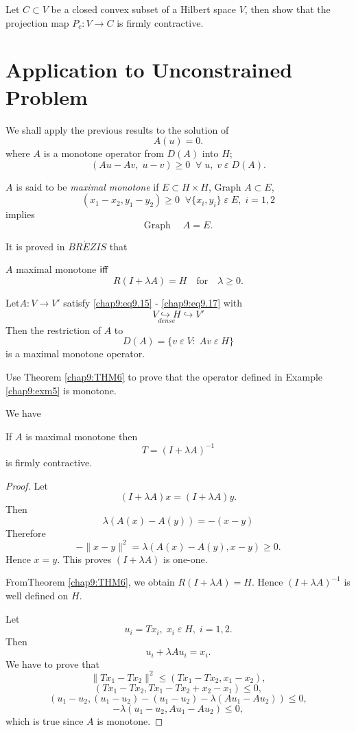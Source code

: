 \begin{exercise}\label{chap9:exr4}
Let $C\subset V$ be a closed convex subset of a Hilbert space $V$,
then show that the projection map $P_c:V\to C$ is firmly contractive.
\end{exercise}

\section{Application to Unconstrained Problem}\label{chap9:sec4}

We shall apply the previous results to the solution of 
$$
A(u)=0.
$$
where $A$ is a monotone operator from $D(A)$ into $H$; \ie
$$
(Au-Av, \;u-v)\geq 0\; \; \forall \;u, \; v \;\varepsilon \;D(A).
$$

$A$ is said to be \emph{maximal monotone} if $E\subset H\times H$,
Graph $A\subset E$,
$$
(x_1-x_2, y_1-y_2)\geq 0\; \; \forall \{x_i,y_i\}\;\varepsilon \;E,\;i=1,2
$$
implies
$$
\text{Graph}\quad \;A=E.
$$

It is proved in $BR\acute{E}ZIS$ \cite{key4} that 

\begin{THM}\label{chap9:THM7}
$A$ maximal monotone $\operatorname{iff}$
$$
R(I+\lambda A)=H\quad\text{for}\quad \lambda \geq 0.
$$
\end{THM}

\begin{exam}\label{chap9:exm5}
Let\pageoriginale $A:V\to V'$ satisfy \eqref{chap9:eq9.15} -
\eqref{chap9:eq9.17} with 
$$
\underset{dense}{V\hookrightarrow H}\hookrightarrow V'
$$
Then the restriction of $A$ to 
$$
D(A)=\{v\;\varepsilon \; V: \; Av \;\varepsilon \; H\}
$$
is a maximal monotone operator.
\end{exam}

\begin{exercise}\label{chap9:exr5}
Use Theorem \ref{chap9:THM6} to prove that the operator defined in
Example \ref{chap9:exm5} is monotone. 

We have
\end{exercise}

\setcounter{lem}{7}
\begin{lem}\label{chap9:lem8}
If $A$ is maximal monotone then
$$
T=(I+\lambda A)^{-1}
$$
is firmly contractive.
\end{lem}

\begin{proof}
Let 
$$
(I+\lambda A)x=(I+\lambda A)y.
$$
Then
$$
\lambda(A(x)-A(y))=-(x-y)
$$
Therefore
$$
-\parallel x-y\parallel^2=\lambda(A(x)-A(y), x-y)\geq 0.
$$
Hence $x=y$. This proves $(I+\lambda A)$ is one-one.

From\pageoriginale Theorem \ref{chap9:THM6}, we obtain $R(I+\lambda
A)=H$. Hence $(I+\lambda A)^{-1}$ is well defined on $H$.

Let 
$$
u_i=Tx_i, \; x_i \;\varepsilon \;H, \; i=1,2.
$$
Then
$$
u_i+\lambda Au_i=x_i.
$$
We have to prove that 
$$
\parallel Tx_1-Tx_2\parallel^2 \leq (Tx_1 -Tx_2, x_1-x_2),
$$
\ie
$$
(Tx_1-Tx_2, Tx_1-Tx_2+x_2-x_1)\leq 0,
$$
\ie
$$
(u_1-u_2,(u_1-u_2)-(u_1-u_2)-\lambda(Au_1-Au_2))\leq 0,
$$
\ie
$$
-\lambda(u_1-u_2, Au_1-Au_2)\leq 0,
$$
which is true since $A$ is monotone.
\end{proof}

